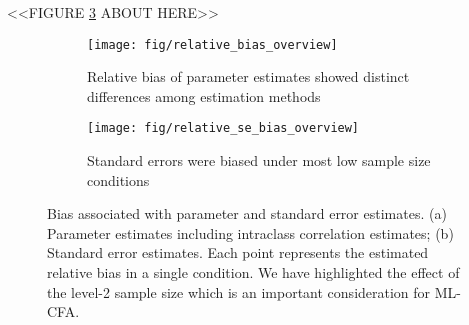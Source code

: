 \documentclass[man, noextraspace, 12pt]{apa7}
\begin{document}
{
  \centering
  <<FIGURE \ref{fig:rb} ABOUT HERE>>
}
\begin{figure}[!htp]
\centering
\begin{subfigure}[b]{1\textwidth}
\centering
\texttt{[image: fig/relative\_bias\_overview]}
\caption{Relative bias of parameter estimates showed distinct differences among estimation methods}
\label{fig:rb-para}
\end{subfigure}

\begin{subfigure}[b]{1\textwidth}
\centering
\texttt{[image: fig/relative\_se\_bias\_overview]}
\caption{Standard errors were biased under most low sample size conditions}
\label{fig:rb-se}
\end{subfigure}
\caption{Bias associated with parameter and standard error estimates. {(a) Parameter estimates including intraclass correlation estimates; (b) Standard error estimates. Each point represents the estimated relative bias in a single condition. We have highlighted the effect of the level-2 sample size which is an important consideration for ML-CFA.}}
\label{fig:rb}
\end{figure}
\end{document}
